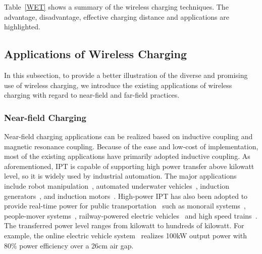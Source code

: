 \documentclass[twocolumn,10pt]{IEEEtran}
\begin{document}
Table~\ref{WET} shows a summary of the wireless charging techniques. The advantage, disadvantage, effective charging distance and applications are highlighted.


 
\subsection{Applications of Wireless Charging}
In this subsection, to provide a better illustration of the diverse and promising use of wireless charging, we introduce the existing applications of wireless charging with regard to near-field and far-field practices.   

\subsubsection{Near-field Charging}

 

Near-field charging applications can be realized based on inductive coupling and magnetic resonance coupling. Because of the ease and low-cost of implementation, most of the existing applications have primarily adopted inductive coupling. As aforementioned, IPT is capable of supporting high power transfer above kilowatt level, so it is widely used by industrial automation. The major applications include robot manipulation~\cite{J.2007Gao,A.1996Kawamura}, automated underwater vehicles~\cite{T.2007McGinnis,Z.2015Cheng,F.2012Tang}, induction generators~\cite{H.2014Gorginpour}, and induction motors~\cite{H.2014Guzman,Y.2014Liang,A.2014Mahmoudi}.
High-power IPT has also been adopted to provide real-time power for public transportation~\cite{A2013Covic} such as monorail systems~\cite{S.2008Raabe,J.2006Elliott,A.2010Keeling}, people-mover systems~\cite{M.2008Jufer}, railway-powered electric vehicles~\cite{J.2014Shin,A.2007Covic,Y.2015Choi,A.2013Russer} and high speed trains~\cite{J.2015Kim,S.2012Lee}. The transferred power level ranges from kilowatt to hundreds of kilowatt. 
For example, the online electric vehicle system~\cite{J.2014Shin,Y.2012Chun} realizes 100kW output power with $80\%$ power efficiency over a 26cm air gap.
\end{document}
